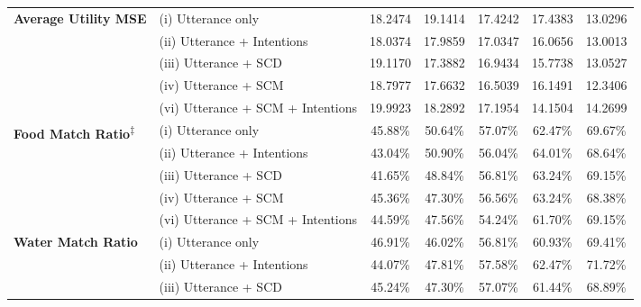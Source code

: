 \begin{table*}[ht]
\begin{tabular}{llccccc}
\midrule
\multirow{5}{*}{\textbf{Average Utility MSE}} & (i) Utterance only & 18.2474 & 19.1414 & 17.4242 & 17.4383 & 13.0296 \\
 & (ii) Utterance + Intentions & \cellcolor{green!25}18.0374 & \cellcolor{green!25}17.9859 & \cellcolor{green!25}17.0347 & \cellcolor{green!25}16.0656 & \cellcolor{green!25}13.0013 \\
 & (iii) Utterance + SCD & \cellcolor{red!25}19.1170 & \cellcolor{green!25}17.3882 & \cellcolor{green!25}16.9434 & \cellcolor{green!25}15.7738 & \cellcolor{red!25}13.0527 \\
 & (iv) Utterance + SCM & \cellcolor{red!25}18.7977 & \cellcolor{green!25}17.6632 & \cellcolor{green!25}16.5039 & \cellcolor{green!25}16.1491 & \cellcolor{green!25}12.3406 \\
 & (vi) Utterance + SCM + Intentions & \cellcolor{red!25}19.9923 & \cellcolor{green!25}18.2892 & \cellcolor{green!25}17.1954 & \cellcolor{green!25}14.1504 & \cellcolor{red!25}14.2699 \\
\midrule
\multirow{5}{*}{\textbf{Food Match Ratio\textsuperscript{$\ddagger$}}} & (i) Utterance only & 45.88\% & 50.64\% & 57.07\% & 62.47\% & 69.67\% \\
 & (ii) Utterance + Intentions & \cellcolor{red!25}43.04\% & \cellcolor{green!25}50.90\% & \cellcolor{red!25}56.04\% & \cellcolor{green!25}64.01\% & \cellcolor{red!25}68.64\% \\
 & (iii) Utterance + SCD & \cellcolor{red!25}41.65\% & \cellcolor{red!25}48.84\% & \cellcolor{red!25}56.81\% & \cellcolor{green!25}63.24\% & \cellcolor{red!25}69.15\% \\
 & (iv) Utterance + SCM & \cellcolor{red!25}45.36\% & \cellcolor{red!25}47.30\% & \cellcolor{red!25}56.56\% & \cellcolor{green!25}63.24\% & \cellcolor{red!25}68.38\% \\
 & (vi) Utterance + SCM + Intentions & \cellcolor{red!25}44.59\% & \cellcolor{red!25}47.56\% & \cellcolor{red!25}54.24\% & \cellcolor{red!25}61.70\% & \cellcolor{red!25}69.15\% \\
\midrule
\multirow{5}{*}{\textbf{Water Match Ratio}} & (i) Utterance only & 46.91\% & 46.02\% & 56.81\% & 60.93\% & 69.41\% \\
 & (ii) Utterance + Intentions & \cellcolor{red!25}44.07\% & \cellcolor{green!25}47.81\% & \cellcolor{green!25}57.58\% & \cellcolor{green!25}62.47\% & \cellcolor{green!25}71.72\% \\
 & (iii) Utterance + SCD & \cellcolor{red!25}45.24\% & \cellcolor{green!25}47.30\% & \cellcolor{green!25}57.07\% & \cellcolor{green!25}61.44\% & \cellcolor{red!25}68.89\% \\

\end{tabular}
\end{table*}
